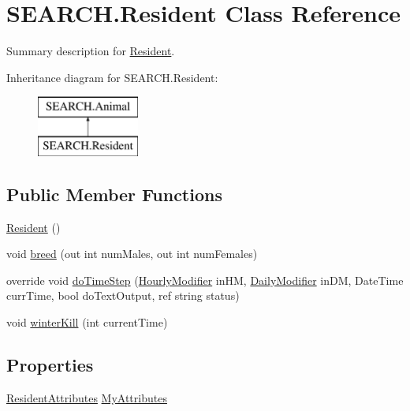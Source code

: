 \hypertarget{class_s_e_a_r_c_h_1_1_resident}{\section{S\-E\-A\-R\-C\-H.\-Resident Class Reference}
\label{class_s_e_a_r_c_h_1_1_resident}
}


Summary description for \hyperlink{class_s_e_a_r_c_h_1_1_resident}{Resident}.  


Inheritance diagram for S\-E\-A\-R\-C\-H.\-Resident\-:\begin{figure}[H]
\begin{center}
\leavevmode
\includegraphics[height=2.000000cm]{class_s_e_a_r_c_h_1_1_resident}
\end{center}
\end{figure}
\subsection*{Public Member Functions}
\begin{DoxyCompactItemize}
\item 
\hyperlink{class_s_e_a_r_c_h_1_1_resident_aece0ff20621058287c6f00696cf13bc6}{Resident} ()
\item 
void \hyperlink{class_s_e_a_r_c_h_1_1_resident_a98f6c7c23ba0c488c86b29552821f804}{breed} (out int num\-Males, out int num\-Females)
\item 
override void \hyperlink{class_s_e_a_r_c_h_1_1_resident_a8b8b9bf2d89bf08618b7649247c98da2}{do\-Time\-Step} (\hyperlink{class_s_e_a_r_c_h_1_1_hourly_modifier}{Hourly\-Modifier} in\-H\-M, \hyperlink{class_s_e_a_r_c_h_1_1_daily_modifier}{Daily\-Modifier} in\-D\-M, Date\-Time curr\-Time, bool do\-Text\-Output, ref string status)
\item 
void \hyperlink{class_s_e_a_r_c_h_1_1_resident_a0130bd18fc8cc7b8e857365a5f1a2f08}{winter\-Kill} (int current\-Time)
\end{DoxyCompactItemize}
\subsection*{Properties}
\begin{DoxyCompactItemize}
\item 
\hyperlink{class_s_e_a_r_c_h_1_1_resident_attributes}{Resident\-Attributes} \hyperlink{class_s_e_a_r_c_h_1_1_resident_a9637f80aa1c0183823803a65d597d485}{My\-Attributes}
\end{DoxyCompactItemize}
